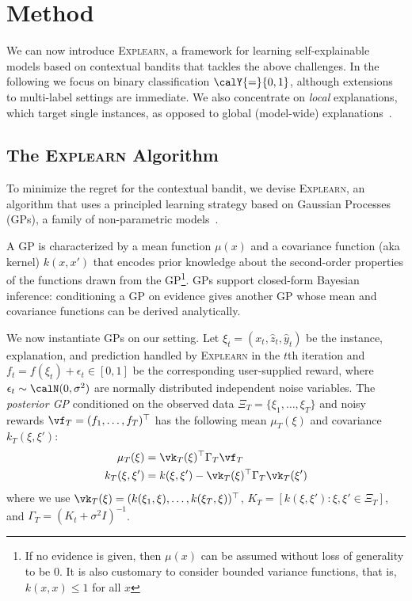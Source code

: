 \documentclass[letterpaper]{article} %
\newcommand{\explearn}{\textsc{Explearn}\xspace}
\begin{document}
\section{Method}\label{sec:solution}

We can now introduce \explearn, a framework for learning self-explainable models based on contextual bandits that tackles the above challenges.
%
In the following we focus on binary classification $\calY {=} \{0, 1\}$,  although extensions to multi-label settings are immediate.  We also concentrate on \emph{local} explanations, which target single instances, as opposed to global (model-wide) explanations~\cite{bastani2017interpreting}.


\subsection{The \explearn Algorithm}

To minimize the regret for the contextual bandit, we devise \explearn, an algorithm that uses a principled learning strategy based on Gaussian Processes (GPs), a family of non-parametric models~\cite{rasmussen2006gaussian}.

A GP is characterized by a mean function $\mu(x)$ and a covariance function (aka kernel) $k(x,x')$ that encodes prior knowledge about the second-order properties of the functions drawn from the GP\footnote{If no evidence is given, then $\mu(x)$ can be assumed without loss of generality to be $0$.  It is also customary to consider bounded variance functions, that is, $k(x,x) \le 1$ for all $x$}.  GPs support closed-form Bayesian inference:  conditioning a GP on evidence gives another GP whose mean and covariance functions can be derived analytically.

We now instantiate GPs on our setting.  Let $\xi_t = (x_t, \hat{z}_t, \hat{y}_t)$  be the instance, explanation, and prediction handled by \explearn in the $t$th iteration and $f_t = f(\xi_t) + \epsilon_t \in [0, 1]$ be the corresponding user-supplied reward, where $\epsilon_t \sim \calN(0, \sigma^2)$ are normally distributed independent noise variables.  
The \emph{posterior GP} conditioned on the observed data $\Xi_T = \{\xi_1, \ldots, \xi_T\}$ and noisy rewards $\vf_T = (f_1, \ldots, f_T)^\top$ has the following mean $\mu_T(\xi)$ and covariance $k_T(\xi, \xi')$:
%
\begin{align}
    \mu_T(\xi)
        & = \vk_T(\xi)^\top \Gamma_T \vf_T
        \label{eq:mut}
    \\
    k_T(\xi, \xi')
        & = k(\xi, \xi') - \vk_T(\xi)^\top \Gamma_T \vk_T(\xi')
        \label{eq:kt}
\end{align}
%
where we use $\vk_T(\xi) = (k(\xi_1, \xi), \ldots, k(\xi_T, \xi))^\top$, $K_T = [k(\xi, \xi') : \xi, \xi' \in \Xi_T]$, and $\Gamma_T = (K_t + \sigma^2 I)^{-1}$.
\end{document}
